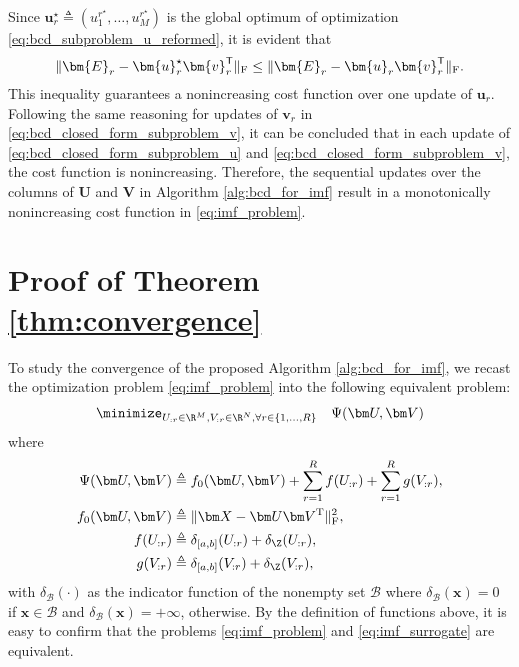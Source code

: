 Since $\bm{u}_r^\star \triangleq (u^{r^\star}_1,\dots,u^{r^\star}_M)$ is the global optimum of optimization \eqref{eq:bcd_subproblem_u_reformed}, it is evident that
\begin{equation}
    \|\bm{E}_r - \bm{u}_r^\star \bm{v}_r^\mathsf{T}\|_{\rm F}  \leq \|\bm{E}_r - \bm{u}_r \bm{v}_r^\mathsf{T}\|_{\rm F}.
\end{equation}
This inequality guarantees a nonincreasing cost function over one update of $\bm u_r$. Following the same reasoning for updates of $\bm v_r$ in \eqref{eq:bcd_closed_form_subproblem_v}, it can be concluded that in each update of \eqref{eq:bcd_closed_form_subproblem_u} and \eqref{eq:bcd_closed_form_subproblem_v}, the cost function is nonincreasing. Therefore, the sequential updates over the columns of $\bm U$ and $\bm V$ in Algorithm \ref{alg:bcd_for_imf} result in a monotonically nonincreasing cost function in \eqref{eq:imf_problem}.


\section{Proof of Theorem \ref{thm:convergence}} \label{app:convergence_proof}

To study the convergence of the proposed Algorithm \ref{alg:bcd_for_imf}, we recast the optimization problem \eqref{eq:imf_problem} into the following equivalent problem:
\begin{align}
    \begin{split}
        \minimize_{U_{:r} \in \R^{M}, V_{:r} \in \R^{N}, \forall r\in\{1,...,R\}} \quad \Psi(\bm U, \bm V)
    \end{split}
    \label{eq:imf_surrogate}
\end{align}
where
\begin{align*}
    \Psi(\bm U, \bm V) & \triangleq f_0(\bm U, \bm V) + \sum_{r=1}^R f(U_{:r}) + \sum_{r=1}^R g(V_{:r}), \\
    f_0(\bm U, \bm V)  & \triangleq \|\bm X - \bm U \bm V^{\rm T} \|_{\rm F}^2,                          \\
    f(U_{:r})          & \triangleq \delta_{[a,b]}(U_{:r}) + \delta_\Z(U_{:r}),                          \\
    g(V_{:r})          & \triangleq \delta_{[a,b]}(V_{:r}) + \delta_\Z(V_{:r}),
\end{align*}
with $\delta_\mathcal{B}(\cdot)$ as the indicator function of the nonempty set $\mathcal{B}$ where $\delta_\mathcal{B}(\bm x) = 0$ if $\bm x \in \mathcal{B}$ and $\delta_\mathcal{B}(\bm x) = +\infty$, otherwise. By the definition of functions above, it is easy to confirm that the problems \eqref{eq:imf_problem} and \eqref{eq:imf_surrogate} are equivalent.

